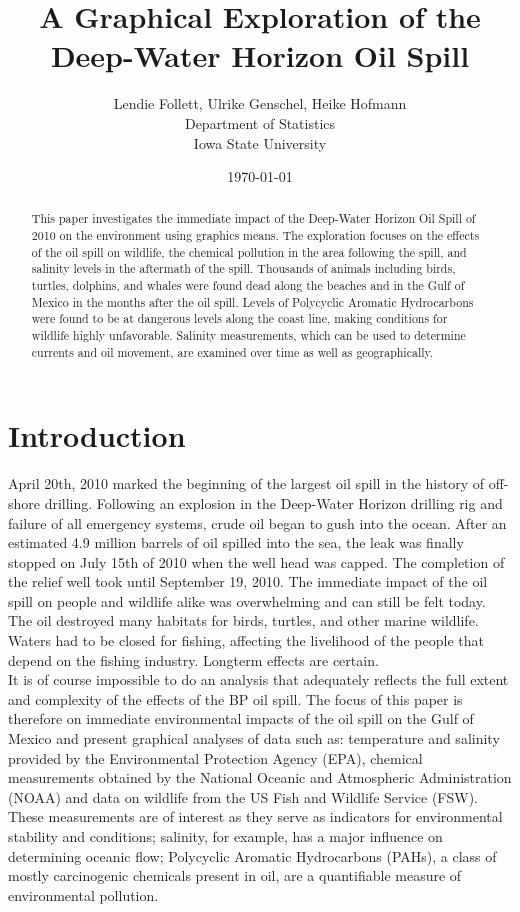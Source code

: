 \documentclass[authoryear,12pt]{elsarticle}
\title{ A Graphical Exploration of the Deep-Water Horizon Oil Spill}
\author{Lendie Follett, Ulrike Genschel, Heike Hofmann\\Department of Statistics\\Iowa State University}
\date{\today}                                           %
\begin{document}
\begin{abstract}

This paper investigates the  immediate impact of the Deep-Water Horizon Oil Spill of 2010 on the environment using graphics means. The exploration focuses on the effects of the oil spill on wildlife, the chemical pollution in the area following the spill, and salinity levels in the aftermath of the spill.
Thousands of animals including birds, turtles, dolphins, and whales were found dead along the beaches and in the Gulf of Mexico in the months after the oil spill. Levels of Polycyclic Aromatic Hydrocarbons were found to be at dangerous levels along the coast line, making conditions for wildlife highly unfavorable. Salinity measurements, which can be used to determine currents and oil movement, are examined over time as well as geographically. 
\end{abstract}

\maketitle

\section{Introduction}
April 20th, 2010 marked the beginning of the largest oil spill in the history of off-shore drilling.  Following an explosion in the Deep-Water Horizon drilling rig and failure of all emergency systems, crude oil began to gush into the ocean.  After an estimated 4.9 million barrels of oil spilled into the sea, the leak was finally stopped on July 15th of 2010 when the well head was capped.  The completion of the relief well took until September 19, 2010.  The immediate impact of the oil spill on people and wildlife alike was overwhelming and can still be felt today.  The oil destroyed many habitats for birds, turtles, and other marine wildlife.  Waters had to be closed for fishing, affecting the livelihood of the people that depend on the fishing industry. Longterm effects are certain. \\

It is of course impossible to do an analysis that adequately reflects the full extent and complexity of the effects of the BP oil spill. The focus  of this paper is therefore on immediate environmental impacts of the oil spill on the Gulf of Mexico and present graphical analyses of data such as: temperature and salinity provided by the Environmental Protection Agency (EPA), chemical measurements obtained by the National Oceanic and Atmospheric Administration (NOAA) and data on wildlife from the US Fish and Wildlife Service (FSW). These measurements are of interest as they serve as indicators for environmental stability and conditions; salinity, for example, has a major influence on determining oceanic flow;  Polycyclic Aromatic Hydrocarbons (PAHs),  a class of mostly carcinogenic chemicals present in oil, are a quantifiable measure of environmental pollution.
\end{document}
